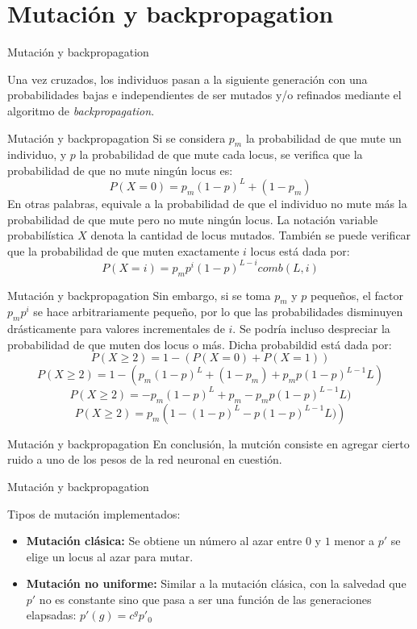 \documentclass{beamer}
\begin{document}
\section{Mutación y backpropagation}
\begin{frame}{Mutación y backpropagation}

\par Una vez cruzados, los individuos pasan a la siguiente generación con una 
probabilidades bajas e independientes de ser mutados y/o refinados 
mediante el algoritmo de \textit{backpropagation}.\\

\end{frame}

\begin{frame}{Mutación y backpropagation}
Si se considera $p_m$ la probabilidad de que mute un individuo, y $p$ la probabilidad de que mute cada locus, se verifica 
que la probabilidad de que no mute ningún locus es:
\[P(X=0) = p_m(1-p)^{L}+(1-p_m)\]
En otras palabras, equivale a la probabilidad de que el individuo no mute más la probabilidad de que mute pero 
no mute ningún locus. La notación variable probabilística $X$ denota la cantidad de locus mutados. 
También se puede verificar que la probabilidad de que muten exactamente $i$ locus está dada por:
\[P(X=i) = p_mp^i(1-p)^{L-i}comb(L,i)\]
\end{frame}

\begin{frame}{Mutación y backpropagation}
Sin embargo, si se toma $p_m$ y $p$ pequeños, el factor $p_mp^i$ se hace arbitrariamente pequeño, por 
lo que las probabilidades disminuyen drásticamente para valores incrementales de $i$. Se podría incluso 
despreciar la probabilidad de que muten dos locus o más. Dicha probabildid está dada por:
\[P(X\ge 2) = 1 - (P(X=0) + P(X=1))\]
\[P(X\ge 2) = 1 - (p_m(1-p)^{L}+(1-p_m) + p_mp(1-p)^{L-1}L)\]
\[P(X\ge 2) = -p_m(1-p)^{L}+p_m - p_mp(1-p)^{L-1}L)\]
\[P(X\ge 2) = p_m\left(1 - (1-p)^{L} - p(1-p)^{L-1}L)\right)\]
\end{frame}

\begin{frame}{Mutación y backpropagation}
En conclusión, la mutción consiste en agregar cierto ruido a uno de los pesos de la red neuronal en cuestión.
\end{frame}

\begin{frame}{Mutación y backpropagation}
\par Tipos de mutación implementados:
\begin{itemize}
\item \textbf{Mutación clásica:} Se obtiene un número al azar entre $0$ y $1$ menor a 
$p'$ se elige un locus al azar para mutar.
\item \textbf{Mutación no uniforme:} Similar a la mutación clásica, con la salvedad que $p'$ no es constante sino que pasa a ser una función de las generaciones elapsadas: $p'(g) = c^{g}p'_0$

\end{itemize}
\end{frame}
\end{document}
